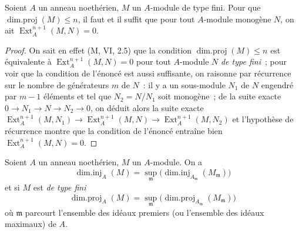 \begin{lemma}[17.2.4]
\label{0.17.2.4-fr}
Soient $A$ un anneau noethérien, $M$ un $A$-module de type fini. Pour que
$\operatorname{dim.proj}(M)\leq n$, il faut et il suffit que pour tout
$A$-module monogène $N$, on ait $\operatorname{Ext}^{n+1}_A(M,N)=0$.
\end{lemma}

\begin{proof}
On sait en effet (M, VI, 2.5) que la condition
$\operatorname{dim.proj}(M)\leq n$ est équivalente à
$\operatorname{Ext}^{n+1}_A(M,N)=0$ pour tout $A$-module $N$ \emph{de type
fini}~; pour voir que la condition de l'énoncé est aussi suffisante, on
raisonne par récurrence sur le nombre de générateurs $m$ de $N$~: il y a un
sous-module $N_1$ de $N$ engendré par $m-1$ éléments et tel que
$N_2=N/N_1$ soit monogène~; de la suite exacte
$0\longrightarrow N_1\longrightarrow N\longrightarrow N_2\longrightarrow0$,
on déduit alors la suite exacte
$\operatorname{Ext}^{n+1}_A(M,N_1)\longrightarrow
\operatorname{Ext}^{n+1}_A(M,N)\longrightarrow
\operatorname{Ext}^{n+1}_A(M,N_2)$ et l'hypothèse de récurrence montre que la
condition de l'énoncé entraîne bien $\operatorname{Ext}^{n+1}_A(M,N)=0$.
\end{proof}

\begin{corollary}[17.2.5]
\label{0.17.2.5-fr}
Soient $A$ un anneau noethérien, $M$ un $A$-module. On a
\begin{equation}
\label{0.17.2.5.1-fr}
\tag{17.2.5.1}
  \operatorname{dim.inj}_A(M)
  =\sup_{\mathfrak{m}}
  \bigl(\operatorname{dim.inj}_{A_{\mathfrak{m}}}(M_{\mathfrak{m}})\bigr)
\end{equation}
et si $M$ est \emph{de type fini}
\begin{equation}
\label{0.17.2.5.2-fr}
\tag{17.2.5.2}
  \operatorname{dim.proj}_A(M)
  =\sup_{\mathfrak{m}}
  \bigl(\operatorname{dim.proj}_{A_{\mathfrak{m}}}(M_{\mathfrak{m}})\bigr)
\end{equation}
où $\mathfrak{m}$ parcourt l'ensemble des idéaux premiers (ou l'ensemble des
idéaux maximaux) de $A$.
\end{corollary}

